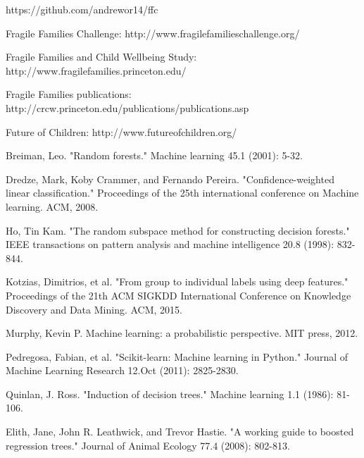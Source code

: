 \documentclass{article} %
\begin{document}
\begin{thebibliography}{}

https://github.com/andrewor14/ffc

Fragile Families Challenge: http://www.fragilefamilieschallenge.org/

Fragile Families and Child Wellbeing Study: http://www.fragilefamilies.princeton.edu/

Fragile Families publications: http://crcw.princeton.edu/publications/publications.asp

Future of Children: http://www.futureofchildren.org/

Breiman, Leo. "Random forests." Machine learning 45.1 (2001): 5-32.

Dredze, Mark, Koby Crammer, and Fernando Pereira. "Confidence-weighted linear classification." Proceedings of the 25th international conference on Machine learning. ACM, 2008.

Ho, Tin Kam. "The random subspace method for constructing decision forests." IEEE transactions on pattern analysis and machine intelligence 20.8 (1998): 832-844.

Kotzias, Dimitrios, et al. "From group to individual labels using deep features." Proceedings of the 21th ACM SIGKDD International Conference on Knowledge Discovery and Data Mining. ACM, 2015.

Murphy, Kevin P. Machine learning: a probabilistic perspective. MIT press, 2012.

Pedregosa, Fabian, et al. "Scikit-learn: Machine learning in Python." Journal of Machine Learning Research 12.Oct (2011): 2825-2830.

Quinlan, J. Ross. "Induction of decision trees." Machine learning 1.1 (1986): 81-106.

Elith, Jane, John R. Leathwick, and Trevor Hastie. "A working guide to boosted regression trees." Journal of Animal Ecology 77.4 (2008): 802-813.
 
\end{thebibliography}
\end{document}
